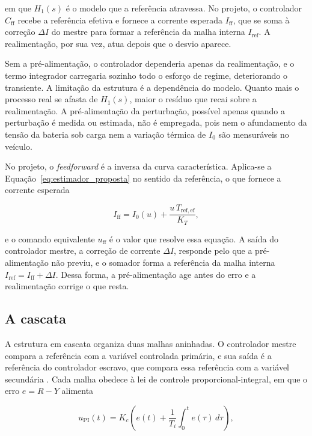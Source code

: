 em que $H_1(s)$ é o modelo que a referência atravessa. No
projeto, o controlador $C_{\mathrm{ff}}$ recebe a referência efetiva e fornece a corrente esperada
$I_{\mathrm{ff}}$, que se soma à correção $\Delta I$ do mestre para formar a referência
da malha interna $I_{\mathrm{ref}}$. A realimentação, por sua vez, atua depois que o
desvio aparece.

Sem a pré-alimentação, o controlador dependeria apenas da realimentação, e o termo
integrador carregaria sozinho todo o esforço de regime, deteriorando o transiente. A
limitação da estrutura é a dependência do modelo. Quanto mais o processo real se afasta
de $H_1(s)$, maior o resíduo que recai sobre a realimentação. A pré-alimentação da
perturbação, possível apenas quando a perturbação é medida ou estimada, não é
empregada, pois nem o afundamento da tensão da bateria sob carga nem a variação
térmica de $I_0$ são mensuráveis no veículo.

No projeto, o \emph{feedforward} é a inversa da curva característica. Aplica-se a
Equação~\eqref{eq:estimador_proposta} no sentido da referência, o que fornece a
corrente esperada

\begin{equation}\label{eq:iff}
I_{\mathrm{ff}} = I_0(u) + \frac{u\,T_{\mathrm{ref,ef}}}{K_T},
\end{equation}

e o comando equivalente $u_{\mathrm{ff}}$ é o valor que resolve essa equação. A saída
do controlador mestre, a correção de corrente $\Delta I$, responde pelo que a
pré-alimentação não previu, e o somador forma a referência da malha interna
$I_{\mathrm{ref}} = I_{\mathrm{ff}} + \Delta I$. Dessa forma, a pré-alimentação age antes do
erro e a realimentação corrige o que resta.

\subsection{A cascata}
\label{sec:cascata}

A estrutura em cascata organiza duas malhas aninhadas. O controlador mestre compara a
referência com a variável controlada primária, e sua saída é a referência do
controlador escravo, que compara essa referência com a variável secundária
\cite{raffo_tcpi_cascata}. Cada malha obedece à lei de controle proporcional-integral,
em que o erro $e = R - Y$ alimenta

\begin{equation}\label{eq:pi}
u_{\mathrm{PI}}(t) = K_c\left(e(t) + \frac{1}{T_i}\int_0^t e(\tau)\,d\tau\right),
\end{equation}

